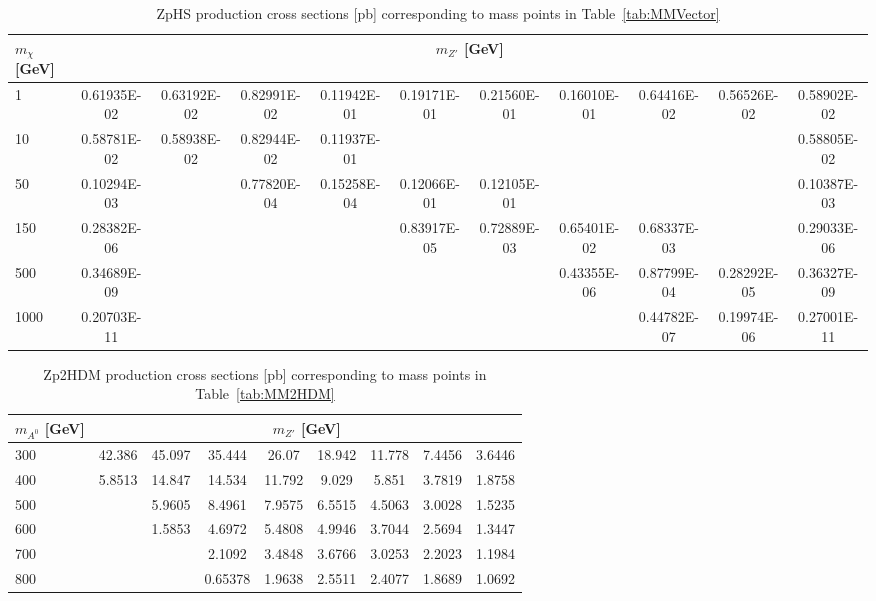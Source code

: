 \begin{sidewaystable*}[htbH]
\begin{adjustbox}{width=\textwidth,totalheight=\textheight,keepaspectratio}
\label{tab:zphsxsecs}
\begin{tabular}{l | c | c | c | c | c | c | c | c | c | c}
\hline 
$m_\chi$ [GeV] & \multicolumn{10}{c}{$m_{Z'}$ [GeV]} \\ 
\hline
1 & 0.61935E-02 & 0.63192E-02 & 0.82991E-02 & 0.11942E-01 & 0.19171E-01 & 0.21560E-01 & 0.16010E-01 & 0.64416E-02 & 0.56526E-02 & 0.58902E-02 \\
10 & 0.58781E-02 & 0.58938E-02 & 0.82944E-02 & 0.11937E-01 & & & & & & 0.58805E-02\\
50 & 0.10294E-03 & & 0.77820E-04 & 0.15258E-04  & 0.12066E-01 & 0.12105E-01 & & & & 0.10387E-03 \\
150 & 0.28382E-06 & & & & 0.83917E-05 & 0.72889E-03 & 0.65401E-02 & 0.68337E-03 & & 0.29033E-06 \\
500 & 0.34689E-09 & & & & & & 0.43355E-06 & 0.87799E-04 & 0.28292E-05 & 0.36327E-09 \\
1000 & 0.20703E-11 & & & & & & & 0.44782E-07 & 0.19974E-06 & 0.27001E-11 \\
\hline
\end{tabular}
\end{adjustbox}
\caption{ZpHS production cross sections [pb] corresponding to mass points in Table~\ref{tab:MMVector}}
\end{sidewaystable*}

\begin{table*}[htbH]
\begin{center}
\begin{tabular}{l | c | c | c | c | c | c | c | c }
\hline 
$m_{A^0}$ [GeV] & \multicolumn{8}{c}{$m_{Z'}$ [GeV]} \\ 
\hline
300 & 42.386 & 45.097 & 35.444 & 26.07 & 18.942 & 11.778 & 7.4456 & 3.6446 \\  
400 & 5.8513 & 14.847 & 14.534 & 11.792 & 9.029 & 5.851 & 3.7819 & 1.8758 \\  
500 & & 5.9605 & 8.4961 & 7.9575 & 6.5515 & 4.5063 & 3.0028 & 1.5235 \\  
600 & & 1.5853 & 4.6972 & 5.4808 & 4.9946 & 3.7044 & 2.5694 & 1.3447 \\
700 & & & 2.1092 & 3.4848 & 3.6766 & 3.0253 & 2.2023 & 1.1984 \\  
800 & & & 0.65378 & 1.9638 & 2.5511 & 2.4077 & 1.8689 & 1.0692 \\  
\hline
\end{tabular}
\caption{Zp2HDM production cross sections [pb] corresponding to mass points in Table~\ref{tab:MM2HDM} \label{tab:zp2hdmxsecs}}
\end{center}
\end{table*}
